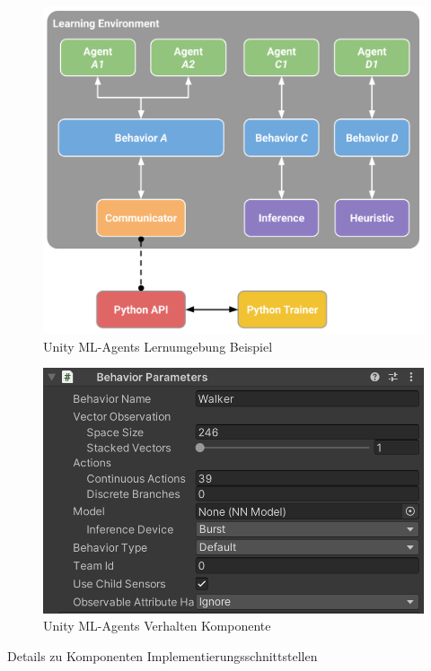 \begin{figure}[htb]
  \centering  
  \includegraphics[scale=0.3]{img/learning_environment_example.png}
  \caption{Unity ML-Agents Lernumgebung Beispiel \protect\cite{unity_mlagents_learning_environment_example}}
  \label{fig:learning_environment_example}
\end{figure}

\begin{figure}[htb]
  \centering  
  \includegraphics[scale=0.5]{img/verhalten_komponente.png}
  \caption{Unity ML-Agents Verhalten Komponente}
  \label{fig:verhalten_komponente}
\end{figure}

Details zu Komponenten
Implementierungsschnittstellen

